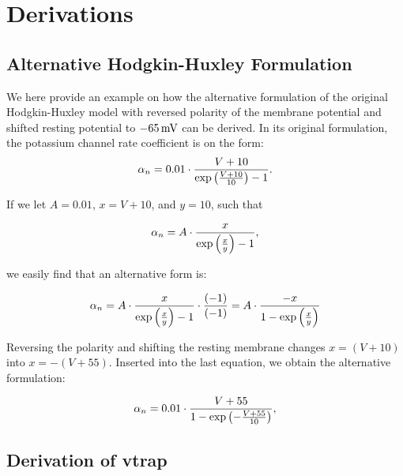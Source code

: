 \chapter{Derivations}\label{sec:Appendix B}

\section{Alternative Hodgkin-Huxley Formulation}

We here provide an example on how the alternative formulation of the original Hodgkin-Huxley model with reversed polarity of the membrane potential and shifted resting potential to $-65\,\mathrm{mV}$ can be derived. In its original formulation, the potassium channel rate coefficient is on the form: 
\begin{equation*}
    \alpha_n = 0.01 \cdot \frac{V+10}{\exp \qty(\frac{V+10}{10})-1}.
\end{equation*}

If we let $A=0.01$, $x=V+10$, and $y=10$, such that

\begin{equation*}
    \alpha_n = A \cdot \frac{x}{\exp \qty(\frac{x}{y})-1},
\end{equation*}

we easily find that an alternative form is:

\begin{equation*}
    \alpha_n = A \cdot \frac{x}{\exp \qty(\frac{x}{y})-1} \cdot \frac{(-1)}{(-1)} = A \cdot \frac{-x}{1-\exp \qty(\frac{x}{y})} 
\end{equation*}

Reversing the polarity and shifting the resting membrane changes $x=(V+10)$ into $x = - (V+55)$. Inserted into the last equation, we obtain the alternative formulation:

\begin{equation*}
    \alpha_n = 0.01 \cdot \frac{V+55}{1 - \exp \qty(-\frac{V+55}{10})},
\end{equation*}


\section{Derivation of vtrap}

